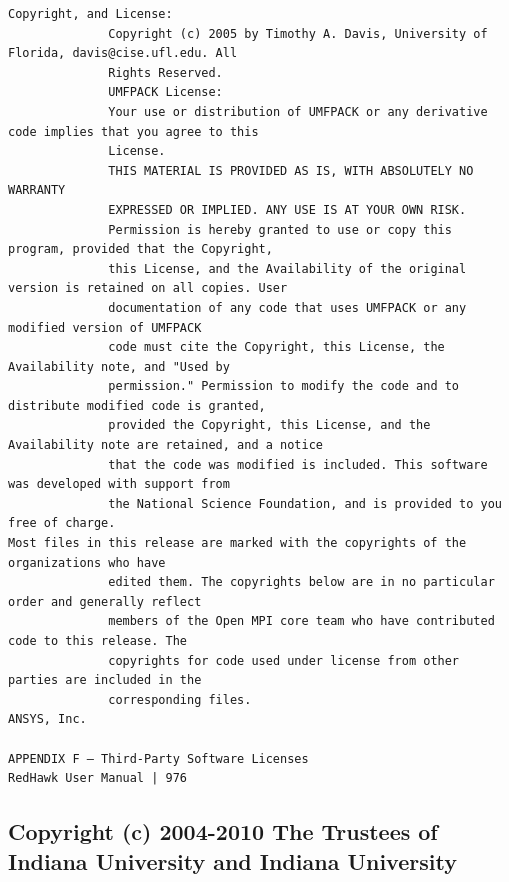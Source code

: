 \begin{lstlisting}[basicstyle=\ttfamily\scriptsize,breaklines=true]
Copyright, and License:
              Copyright (c) 2005 by Timothy A. Davis, University of Florida, davis@cise.ufl.edu. All
              Rights Reserved.
              UMFPACK License:
              Your use or distribution of UMFPACK or any derivative code implies that you agree to this
              License.
              THIS MATERIAL IS PROVIDED AS IS, WITH ABSOLUTELY NO WARRANTY
              EXPRESSED OR IMPLIED. ANY USE IS AT YOUR OWN RISK.
              Permission is hereby granted to use or copy this program, provided that the Copyright,
              this License, and the Availability of the original version is retained on all copies. User
              documentation of any code that uses UMFPACK or any modified version of UMFPACK
              code must cite the Copyright, this License, the Availability note, and "Used by
              permission." Permission to modify the code and to distribute modified code is granted,
              provided the Copyright, this License, and the Availability note are retained, and a notice
              that the code was modified is included. This software was developed with support from
              the National Science Foundation, and is provided to you free of charge.
Most files in this release are marked with the copyrights of the organizations who have
              edited them. The copyrights below are in no particular order and generally reflect
              members of the Open MPI core team who have contributed code to this release. The
              copyrights for code used under license from other parties are included in the
              corresponding files.
ANSYS, Inc.

APPENDIX F — Third-Party Software Licenses                                    RedHawk User Manual | 976
\end{lstlisting}

\subsection{Copyright (c) 2004-2010 The Trustees of Indiana University and Indiana University}

